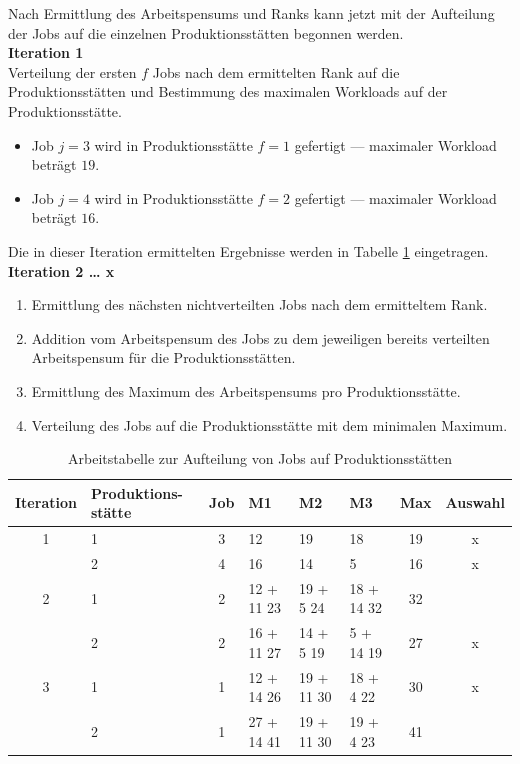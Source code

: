 \documentclass[final, english, ngerman, a4paper, 12pt, %
numbers=noenddot,
cd=true,
cdfont=false,cdfont=nohead,cdfont=nodin,
cdmath=false,
cdhead=false,
cdfoot=true,
cdcover=monochrome,
cdgeometry=symmetric,
declaration=heading,
declaration=notoc,
abstract=heading,
]{tudscrreprt}
\begin{document}
\noindent
Nach Ermittlung des Arbeitspensums und Ranks kann jetzt mit der Aufteilung der Jobs auf die einzelnen Produktionsstätten begonnen werden.\\

\noindent
\textbf{Iteration 1}\\
\noindent
Verteilung der ersten $f$ Jobs nach dem ermittelten Rank auf die Produktionsstätten und Bestimmung des maximalen Workloads auf der Produktionsstätte.

\begin{itemize}
	\item Job $j=3$ wird in Produktionsstätte $f=1$ gefertigt — maximaler Workload beträgt $19$.
	\item Job $j=4$ wird in Produktionsstätte $f=2$ gefertigt — maximaler Workload beträgt $16$.
\end{itemize}
\noindent
Die in dieser Iteration ermittelten Ergebnisse werden in Tabelle \ref{tab:aufteilung} eingetragen.\\

\noindent
\textbf{Iteration 2 … x}
\begin{enumerate}
	\item Ermittlung des nächsten nichtverteilten Jobs nach dem ermitteltem Rank.
	\item Addition vom Arbeitspensum des Jobs zu dem jeweiligen bereits verteilten Arbeitspensum für die Produktionsstätten.
	\item Ermittlung des Maximum des Arbeitspensums pro Produktionsstätte.
	\item Verteilung des Jobs auf die Produktionsstätte mit dem minimalen Maximum.
\end{enumerate}

\begin{table}[H]
	\centering
	\begin{tabular}{c p{2.5cm} c p{1.5cm} p{1.5cm} p{1.5cm} c c}
		\toprule
		Iteration & Produktions-stätte & Job & M1          & M2         & M3         & Max & Auswahl \\
		\midrule
		1            & 1                   & 3   & 12          & 19         & 18         & 19      & x       \\
					 & 2                   & 4   & 16          & 14         & 5          & 16      & x       \\
		\midrule
		2           & 1                   & 2   & 12 + 11 23   & 19 + 5 24  & 18 + 14 32 & 32      &         \\
					 & 2                   & 2   & 16 + 11 27  & 14 + 5 19  & 5 + 14 19  & 27      & x      \\
		\midrule
		3			& 1                   & 1   & 12 + 14 26  & 19 + 11 30 & 18 + 4 22  & 30      & x       \\
					 & 2                   & 1   & 27 + 14 41 & 19 + 11 30 & 19 + 4 23  & 41      &        \\
		\bottomrule
	\end{tabular}
	\caption{Arbeitstabelle zur Aufteilung von Jobs auf Produktionsstätten}
	\label{tab:aufteilung}
\end{table}
\end{document}
